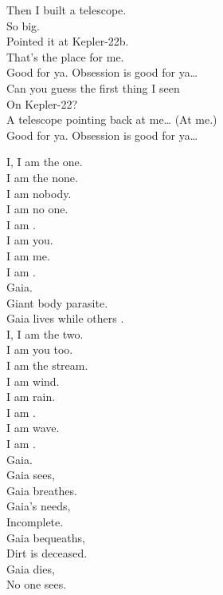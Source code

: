 Then I built a telescope. \\
So big. \\
Pointed it at Kepler-22b. \\
That's the place for me. \\

Good for ya. Obsession is good for ya… \\

Can you guess the first thing I seen \\
On Kepler-22? \\
A telescope pointing back at me… (At me.) \\

Good for ya. Obsession is good for ya… \\





I, I am the one. \\
I am the none. \\
I am nobody. \\
I am no one. \\
I am . \\
I am you. \\
I am me. \\

I am . \\
Gaia. \\

Giant body parasite. \\
Gaia lives while others . \\

I, I am the two. \\
I am you too. \\
I am the stream. \\
I am wind. \\
I am rain. \\
I am . \\
I am wave. \\

I am . \\
Gaia. \\

Gaia sees, \\
Gaia breathes. \\
Gaia's needs, \\
Incomplete. \\
Gaia bequeaths, \\
Dirt is deceased. \\
Gaia dies, \\
No one sees. \\

